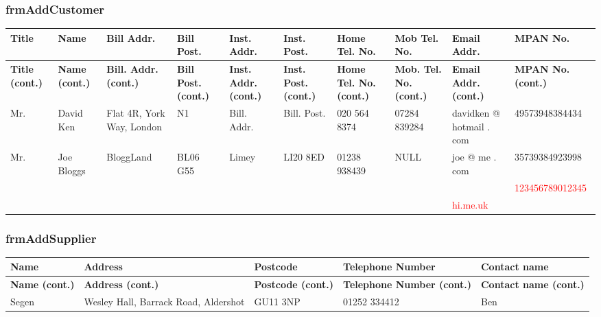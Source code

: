\subsubsection{frmAddCustomer}

\begin{longtable}{ | p{1cm} | p{1.5cm} | p{1.5cm} | p{1cm} | p{1.5cm} | p{1cm} | p{1cm} | p{1cm} | p{1.5cm} | p{2.6cm} | }
	\hline
	\textbf{Title} & \textbf{Name} & \textbf{Bill Addr.} & \textbf{Bill Post.} & \textbf{Inst. Addr.} & \textbf{Inst. Post.} & \textbf{Home Tel. No.} & \textbf{Mob Tel. No.} & \textbf{Email Addr.} & \textbf{MPAN No.}\\
	\endfirsthead
	\hline
	\textbf{Title (cont.)} & \textbf{Name (cont.)} & \textbf{Bill. Addr. (cont.)} & \textbf{Bill Post. (cont.)} & \textbf{Inst. Addr. (cont.)} & \textbf{Inst. Post. (cont.)} & \textbf{Home Tel. No. (cont.)} & \textbf{Mob. Tel. No. (cont.)} & \textbf{Email Addr. (cont.)} & \textbf{MPAN No. (cont.)}\\
	\endhead
	\hline
	Mr. & David Ken & Flat 4R, York Way, London & N1 & Bill. Addr. & Bill. Post. & 020 564 8374 & 07284 839284 & davidken @ hotmail . com & 49573948384434\\
	\hline
	Mr. & Joe Bloggs & BloggLand & BL06 G55 & Limey & LI20 8ED & 01238 938439 & NULL & joe @ me . com & 35739384923998\\
	\hline
	& & & & & & & & & \textcolor{red}{123456789012345}\\
	\hline
	& & & & & & & & \textcolor{red}{hi.me.uk} &\\
	\hline
\end{longtable}

\subsubsection{frmAddSupplier}

\begin{longtable}{ | p{3cm} | p{4cm} | p{2cm} | p{4cm} | p{3cm} | }
	\hline
	\textbf{Name} & \textbf{Address} & \textbf{Postcode} & \textbf{Telephone Number} & \textbf{Contact name}\\
	\endfirsthead
	\hline
	\textbf{Name (cont.)} & \textbf{Address (cont.)} & \textbf{Postcode (cont.)} & \textbf{Telephone Number (cont.)} & \textbf{Contact name (cont.)}\\
	\endhead
	\hline
	Segen & Wesley Hall, Barrack Road, Aldershot & GU11 3NP & 01252 334412 & Ben\\
	\hline
\end{longtable}


